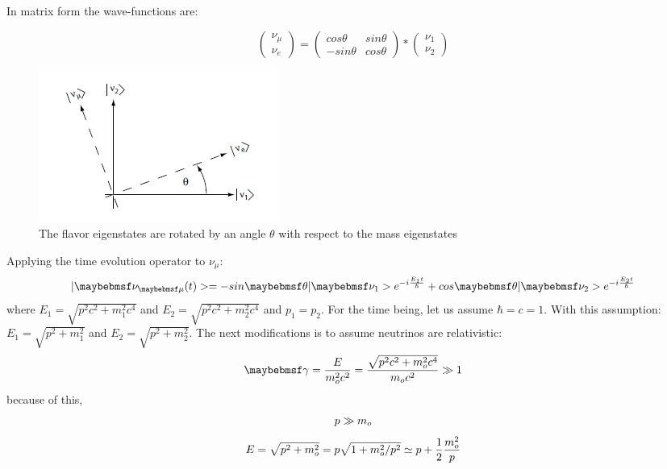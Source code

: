 In matrix form the wave-functions are:

\begin{equation}
\begin{pmatrix}
\nu_{\mu} \\
\nu_{e}
\end{pmatrix} 
 = \begin{pmatrix}
cos\theta & sin\theta \\
-sin\theta & cos\theta 
\end{pmatrix}*
\begin{pmatrix}
\nu_{1} \\
\nu_{2} 
\end{pmatrix}
\end{equation}

\begin{figure}[htp]
\centering
\includegraphics[scale=.8]{figs/mixingangle.jpg}
\caption{The flavor eigenstates are rotated by an angle $\theta$ with respect to the mass eigenstates}
\label{fig:mixing}
\end{figure}
Applying the time evolution operator to $\nu_{\mu}$:
\begin{equation}
\centering
\label{eq:timeevol}
|\nu_{\mu}(t)> = -sin\theta|\nu_{1}>e^{-i\frac{E_{1}t}{\hbar}} + cos\theta|\nu_{2}>e^{-i\frac{E_{2}t}{\hbar}}
\end{equation}
where $E_{1} = \sqrt{p^2 c^2 + m^2_{1} c^4}$ and $E_{2} = \sqrt{p^2 c^2 + m^2_{2} c^4}$ and $p_{1}=p_{2}$. For the time being, let us assume $\hbar=c=1$. 
With this assumption:
$E_{1}=\sqrt{p^2+m^2_{1}}$ and $E_{2} = \sqrt{p^2 + m^2_{2}}$.
The next modifications is to assume neutrinos are relativistic:
\begin{equation}
\centering
\label{eq:gamma}
\gamma = \frac{E}{m^2_{o} c^2} = \frac{\sqrt{p^2 c^2 + m^2_{o} c^4}}{m_{o} c^2} \gg 1
\end{equation}
because of this,
\begin{equation}
\centering
p \gg m_{o}
\end{equation}
\begin{equation}
\centering
E = \sqrt{p^2 + m^2_{o}}=p\sqrt{1+m^2_{o}/p^2}\simeq p + \frac{1}{2}\frac{m^2_{o}}{p}
\end{equation}
